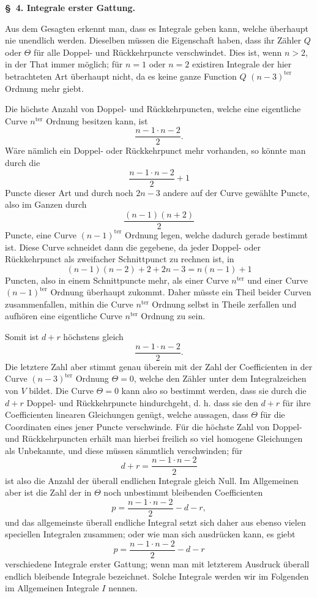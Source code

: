 \documentclass[10pt]{article}
\begin{document}
\begin{center}
{\bfseries \S\ 4. Integrale erster Gattung.}
\end{center}

Aus dem Gesagten erkennt man, dass es Integrale geben kann, welche überhaupt nie unendlich werden. Dieselben müssen die Eigenschaft haben, dass ihr Zähler $Q$ oder $\Theta$ für alle Doppel- und Rückkehrpuncte verschwindet. Dies ist, wenn $n>2$, in der That immer möglich; für $n=1$ oder $n=2$ existiren Integrale der hier betrachteten Art überhaupt nicht, da es keine ganze Function $Q$ $(n-3)^{\mathrm{ter}}$ Ordnung mehr giebt.

Die höchste Anzahl von Doppel- und Rückkehrpuncten, welche eine eigentliche Curve $n^{\mathrm{ter}}$ Ordnung besitzen kann, ist
\[
\frac{n-1\cdot n-2}{2}.
\]
Wäre nämlich ein Doppel- oder Rückkehrpunct mehr vorhanden, so könnte man durch die
\[
\frac{n-1\cdot n-2}{2}+1
\]
Puncte dieser Art und durch noch $2n-3$ andere auf der Curve gewählte Puncte, also im Ganzen durch
\[
\frac{(n-1)(n+2)}{2}
\]
Puncte, eine Curve $(n-1)^{\mathrm{ter}}$ Ordnung legen, welche dadurch gerade bestimmt ist. Diese Curve schneidet dann die gegebene, da jeder Doppel- oder Rückkehrpunct als zweifacher Schnittpunct zu rechnen ist, in
\[
(n-1)(n-2)+2+2n-3=n(n-1)+1
\]
Puncten, also in einem Schnittpuncte mehr, als einer Curve $n^{\mathrm{ter}}$ und einer Curve $(n-1)^{\mathrm{ter}}$ Ordnung überhaupt zukommt. Daher müsste ein Theil beider Curven zusammenfallen, mithin die Curve $n^{\mathrm{ter}}$ Ordnung selbst in Theile zerfallen und aufhören eine eigentliche Curve $n^{\mathrm{ter}}$ Ordnung zu sein.

Somit ist $d+r$ höchstens gleich
\[
\frac{n-1\cdot n-2}{2}.
\]
Die letztere Zahl aber stimmt genau überein mit der Zahl der Coefficienten in der Curve $(n-3)^{\mathrm{ter}}$ Ordnung $\Theta=0$, welche den Zähler unter dem Integralzeichen von $V$ bildet. Die Curve $\Theta=0$ kann also so bestimmt werden, dass sie durch die $d+r$ Doppel- und Rückkehrpuncte hindurchgeht, d. h. dass sie den $d+r$ für ihre Coefficienten linearen Gleichungen genügt, welche aussagen, dass $\Theta$ für die Coordinaten eines jener Puncte verschwinde. Für die höchste Zahl von Doppel- und Rückkehrpuncten erhält man hierbei freilich so viel homogene Gleichungen als Unbekannte, und diese müssen sämmtlich verschwinden; für
\[
d+r=\frac{n-1\cdot n-2}{2}
\]
ist also die Anzahl der überall endlichen Integrale gleich Null. Im Allgemeinen aber ist die Zahl der in $\Theta$ noch unbestimmt bleibenden Coefficienten
\[
p=\frac{n-1\cdot n-2}{2}-d-r,
\]
und das allgemeinste überall endliche Integral setzt sich daher aus ebenso vielen speciellen Integralen zusammen; oder wie man sich ausdrücken kann, es giebt
\[
p=\frac{n-1\cdot n-2}{2}-d-r
\]
verschiedene Integrale erster Gattung; wenn man mit letzterem Ausdruck überall endlich bleibende Integrale bezeichnet. Solche Integrale werden wir im Folgenden im Allgemeinen Integrale $I$ nennen.
\end{document}
